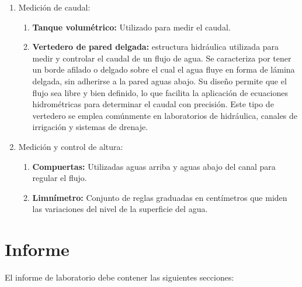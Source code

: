 \documentclass[10pt, a4paper]{exam}
\begin{document}
\begin{enumerate}

    \item Medición de caudal:
    
        \begin{enumerate}
        
            \item \textbf{Tanque volumétrico:} Utilizado para medir el caudal.

            \item \textbf{Vertedero de pared delgada:} estructura hidráulica utilizada para medir y controlar el caudal de un flujo de agua. Se caracteriza por tener un borde afilado o delgado sobre el cual el agua fluye en forma de lámina delgada, sin adherirse a la pared aguas abajo. Su diseño permite que el flujo sea libre y bien definido, lo que facilita la aplicación de ecuaciones hidrométricas para determinar el caudal con precisión. Este tipo de vertedero se emplea comúnmente en laboratorios de hidráulica, canales de irrigación y sistemas de drenaje.
            
        \end{enumerate}
        
    \item Medición y control de altura:
    
        \begin{enumerate}
        
            \item \textbf{Compuertas:} Utilizadas aguas arriba y aguas abajo del canal para regular el flujo.
            \item \textbf{Limnímetro:} Conjunto de reglas graduadas en centímetros que miden las variaciones del nivel de la superficie del agua.
            
        \end{enumerate}
        
\end{enumerate}

\section{Informe}

El informe de laboratorio debe contener las siguientes secciones:
\end{document}
